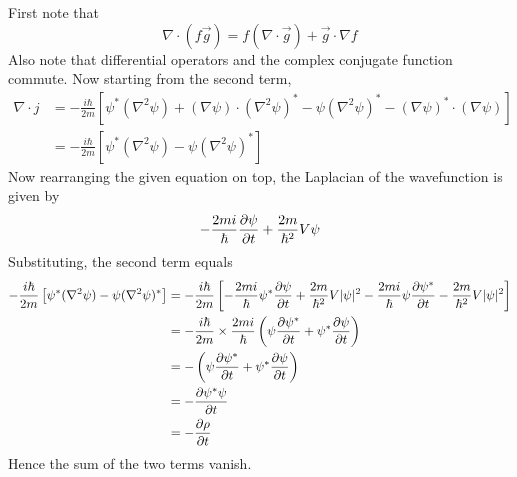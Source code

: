 \documentclass[answers]{exam}
\begin{document}
\begin{questions}
\begin{solution}
    First note that
    \begin{equation}
        \nabla \cdot (f\vec g) = f(\nabla \cdot \vec g) + \vec g \cdot \nabla f
    \end{equation}
    Also note that differential operators and the complex conjugate function commute. Now starting from the second term,
    \begin{align*}
        \nabla \cdot j &= -\frac{i\hbar}{2m} \left[\psi^*(\nabla^2\psi) + (\nabla\psi)\cdot(\nabla^2\psi)^* - \psi(\nabla^2\psi)^* - (\nabla\psi)^*\cdot(\nabla\psi)\right] \\
                       &= -\frac{i\hbar}{2m} \left[\psi^*(\nabla^2\psi) - \psi(\nabla^2\psi)^*\right]
    \end{align*}
    Now rearranging the given equation on top, the Laplacian of the wavefunction is given by
    \begin{equation}
        -\frac{2mi}{\hbar} \frac{\partial \psi}{\partial t} + \frac{2m}{\hbar^2} V\psi
    \end{equation}
    Substituting, the second term equals
    \begin{align*}
        -\frac{i\hbar}{2m} \left[\psi^*(\nabla^2\psi) - \psi(\nabla^2\psi)^*\right] &= -\frac{i\hbar}{2m} \left[-\frac{2mi}{\hbar}\psi^*\frac{\partial \psi}{\partial t} + \frac{2m}{\hbar^2}V|\psi|^2 - \frac{2mi}{\hbar} \psi\frac{\partial \psi^*}{\partial t} - \frac{2m}{\hbar^2} V|\psi|^2\right] \\
                                                                                    &= -\frac{i\hbar}{2m} \times \frac{2mi}{\hbar} \left(\psi\frac{\partial \psi^*}{\partial t} + \psi^*\frac{\partial \psi}{\partial t}\right) \\
                                                                                    &= -\left(\psi\frac{\partial \psi^*}{\partial t} + \psi^*\frac{\partial \psi}{\partial t}\right) \\
                                                                                    &= -\frac{\partial \psi^*\psi}{\partial t} \\
                                                                                    &= -\frac{\partial \rho}{\partial t}
    \end{align*}
    Hence the sum of the two terms vanish.
\end{solution}

\end{questions}
\end{document}
